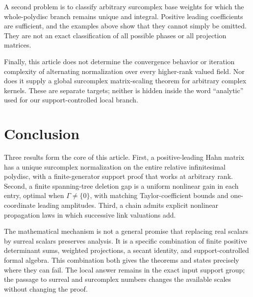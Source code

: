 \documentclass[11pt,a4paper]{article}
\numberwithin{equation}{section}
\theoremstyle{definition}
\begin{document}
A second problem is to classify arbitrary surcomplex base weights
for which the whole-polydisc branch remains unique and integral.
Positive leading coefficients are sufficient, and the examples above
show that they cannot simply be omitted. They are not an exact
classification of all possible phases or all projection matrices.

Finally, this article does not determine the convergence behavior or
iteration complexity of alternating normalization over every
higher-rank valued field. Nor does it supply a global surcomplex
matrix-scaling theorem for arbitrary complex kernels. These are
separate targets; neither is hidden inside the word ``analytic''
used for our support-controlled local branch.

\section{Conclusion}\label{scale:sec:conclusion}
Three results form the core of this article. First, a positive-leading
Hahn matrix has a unique surcomplex normalization on the entire
relative infinitesimal polydisc, with a finite-generator support proof
that works at arbitrary rank. Second, a finite spanning-tree deletion
gap is a uniform nonlinear gain in each entry, optimal when
$\Gamma\ne\{0\}$, with matching Taylor-coefficient bounds and
one-coordinate leading amplitudes.
Third, a chain admits explicit nonlinear propagation laws in which
successive link valuations add.

The mathematical mechanism is not a general promise that replacing
real scalars by surreal scalars preserves analysis. It is a specific
combination of finite positive determinant sums, weighted projections,
a secant identity, and support-controlled formal algebra. This
combination both gives the theorems and states precisely where they
can fail. The local answer remains in the exact input support group;
the passage to surreal and surcomplex numbers changes the available
scales without changing the proof.

\appendix
\end{document}
